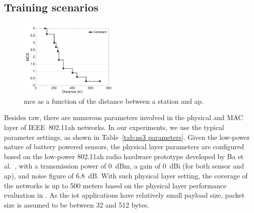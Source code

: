 

\subsection{Training scenarios \label{subsec:training scenarios}}


\begin{figure}[t]
  \centering
  \includegraphics[width=0.45\textwidth]{figures/distance-datarate}  \caption{\gls{mcs} as a function of the distance between a station and \gls{ap}. \label{fig:dist-datarate}}
\end{figure}

Besides \gls{raw}, there are numerous parameters involved in the physical and MAC layer of IEEE~802.11ah networks.
In our experiments, we use the typical parameter settings, 
as shown in Table~\ref{tab:ns3 parameters}. Given the low-power nature of battery powered sensors, the physical layer parameters are configured based on the low-power 802.11ah radio hardware prototype developed by Ba et al.~\cite{Ba2016}, with a transmission power of 0~dBm, a gain of 0~dBi (for both sensor and \gls{ap}), and noise figure of 6.8~dB. With such physical layer setting, the coverage of the networks is up to 500 meters based on the physical layer performance evaluation in \cite{bellekens2017outdoor}. As the \gls{iot} applications have relatively small payload size, packet size is assumed to be between 32 and 512 bytes.


